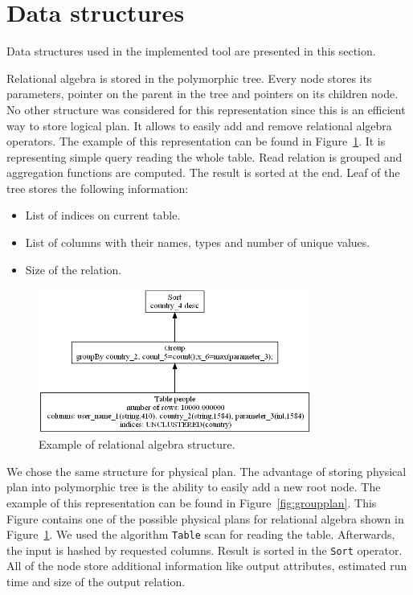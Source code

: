 \section{Data structures}

Data structures used in the implemented tool are presented in this section.

Relational algebra is stored in the polymorphic tree. Every node stores its parameters, pointer on the parent in the tree and pointers on its children node. No other structure was considered for this representation since this is an efficient way to store logical plan. It allows to easily add and remove relational algebra operators.
The example of this representation can be found in Figure~\ref{fig:groupalgebra}. It is representing simple query reading the whole table. Read relation is grouped and aggregation functions are computed. The result is sorted at the end. Leaf of the tree stores the following information:
\begin{itemize}
\item List of indices on current table.
\item List of columns with their names, types and number of unique values.
\item Size of the relation.
\end{itemize}
\begin{figure}[h!]
  \centering
    \includegraphics[width=0.8\textwidth]{groupalgebra}

      \caption{Example of relational algebra structure.}
          \label{fig:groupalgebra}
\end{figure}

We chose the same structure for physical plan. The advantage of storing physical plan into polymorphic tree is the ability to easily add a new root node. The example of this representation can be found in Figure~\ref{fig:groupplan}. This Figure contains one of the possible physical plans for relational algebra shown in Figure~\ref{fig:groupalgebra}. We used the algorithm \texttt{Table} scan for reading the table. Afterwards, the input is hashed by requested columns. Result is sorted in the \texttt{Sort} operator. All of the node store additional information like output attributes, estimated run time and size of the output relation.

